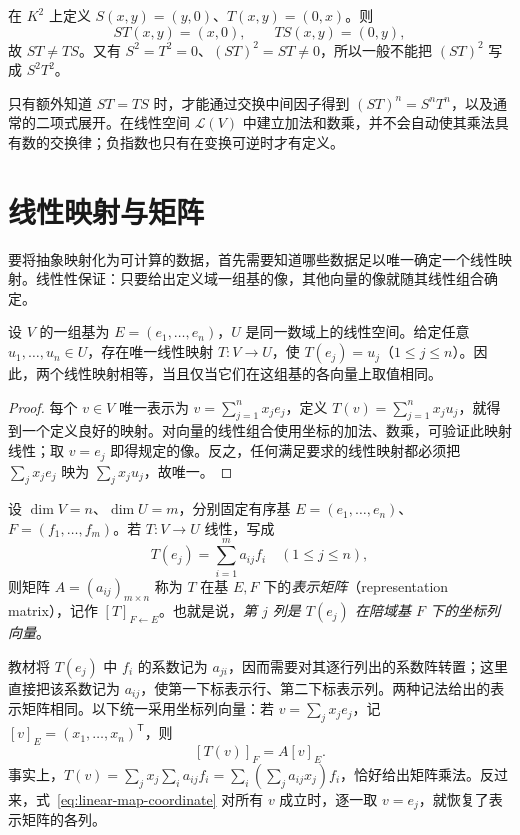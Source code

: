 \begin{example}
\label{ex:linear-map-noncommuting}
在 $K^2$ 上定义 $S(x,y)=(y,0)$、$T(x,y)=(0,x)$。则
\[
    ST(x,y)=(x,0),\qquad TS(x,y)=(0,y),
\]
故 $ST\ne TS$。又有 $S^2=T^2=0$、$(ST)^2=ST\ne0$，所以一般不能把 $(ST)^2$ 写成 $S^2T^2$。
\end{example}

只有额外知道 $ST=TS$ 时，才能通过交换中间因子得到 $(ST)^n=S^nT^n$，以及通常的二项式展开。在线性空间 $\mathcal L(V)$ 中建立加法和数乘，并不会自动使其乘法具有数的交换律；负指数也只有在变换可逆时才有定义。

\section{线性映射与矩阵}
\label{sec:linear-map-matrix}

要将抽象映射化为可计算的数据，首先需要知道哪些数据足以唯一确定一个线性映射。线性性保证：只要给出定义域一组基的像，其他向量的像就随其线性组合确定。

\begin{lemma}
\label{lem:linear-map-basis-images}
设 $V$ 的一组基为 $E=(e_1,\ldots,e_n)$，$U$ 是同一数域上的线性空间。给定任意 $u_1,\ldots,u_n\in U$，存在唯一线性映射 $T:V\to U$，使 $T(e_j)=u_j$（$1\leq j\leq n$）。因此，两个线性映射相等，当且仅当它们在这组基的各向量上取值相同。
\end{lemma}

\begin{proof}
每个 $v\in V$ 唯一表示为 $v=\sum_{j=1}^n x_je_j$，定义 $T(v)=\sum_{j=1}^n x_ju_j$，就得到一个定义良好的映射。对向量的线性组合使用坐标的加法、数乘，可验证此映射线性；取 $v=e_j$ 即得规定的像。反之，任何满足要求的线性映射都必须把 $\sum_jx_je_j$ 映为 $\sum_jx_ju_j$，故唯一。
\end{proof}

\begin{definition}
\label{def:linear-map-representation}
设 $\dim V=n$、$\dim U=m$，分别固定有序基 $E=(e_1,\ldots,e_n)$、$F=(f_1,\ldots,f_m)$。若 $T:V\to U$ 线性，写成
\[
    T(e_j)=\sum_{i=1}^m a_{ij}f_i\quad(1\leq j\leq n),
\]
则矩阵 $A=(a_{ij})_{m\times n}$ 称为 $T$ 在基 $E,F$ 下的\emph{表示矩阵}（representation matrix），记作 $[T]_{F\leftarrow E}$。也就是说，\emph{第 $j$ 列是 $T(e_j)$ 在陪域基 $F$ 下的坐标列向量}。
\end{definition}

教材将 $T(e_j)$ 中 $f_i$ 的系数记为 $a_{ji}$，因而需要对其逐行列出的系数阵转置；这里直接把该系数记为 $a_{ij}$，使第一下标表示行、第二下标表示列。两种记法给出的表示矩阵相同。以下统一采用坐标列向量：若 $v=\sum_jx_je_j$，记 $[v]_E=(x_1,\ldots,x_n)^{\mathsf T}$，则
\begin{equation}
\label{eq:linear-map-coordinate}
    [T(v)]_F=A[v]_E.
\end{equation}
事实上，$T(v)=\sum_jx_j\sum_ia_{ij}f_i=\sum_i(\sum_ja_{ij}x_j)f_i$，恰好给出矩阵乘法。反过来，式~\eqref{eq:linear-map-coordinate} 对所有 $v$ 成立时，逐一取 $v=e_j$，就恢复了表示矩阵的各列。

